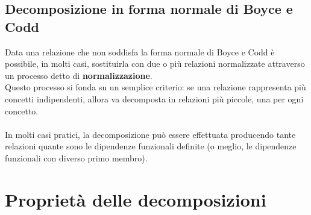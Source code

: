 \subsection{Decomposizione in forma normale di Boyce e Codd}
Data una relazione che non soddisfa la forma normale di Boyce e Codd è possibile, in molti casi, sostituirla con due o più relazioni normalizzate attraverso un processo detto di \textbf{normalizzazione}.\\
Questo processo si fonda su un semplice criterio: se una relazione rappresenta più concetti indipendenti, allora va decomposta in relazioni più piccole, una per ogni concetto.\\\\
In molti casi pratici, la decomposizione può essere effettuata producendo tante relazioni quante sono le dipendenze funzionali definite (o meglio, le dipendenze funzionali con diverso primo membro).

\section{Proprietà delle decomposizioni}
